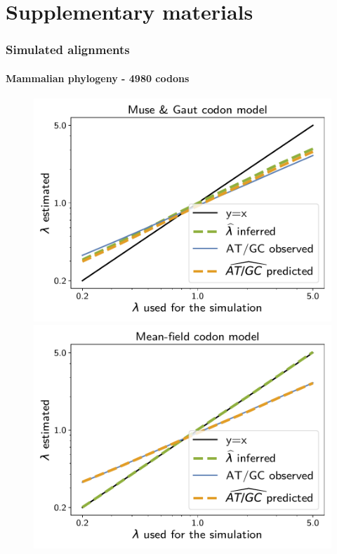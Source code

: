 \documentclass{article}
\begin{document}
\part*{Supplementary materials}
\tableofcontents
 
\vspace*{1cm}

\section{Simulated alignments}

\subsection{Mammalian phylogeny - 4980 codons}

\begin{figure}[!htb]
    \centering
    \begin{minipage}{0.325\linewidth}
        \includegraphics[width=\linewidth, page=1]{inference_supp_mat/MammalsExons10Mu1.0_lambda_MG.pdf}
    \end{minipage}
    \hfill
    \begin{minipage}{0.325\linewidth}
        \includegraphics[width=\linewidth, page=1]{inference_supp_mat/MammalsExons10Mu1.0_lambda_MF.pdf}

\end{minipage}
\end{figure}
\end{document}

